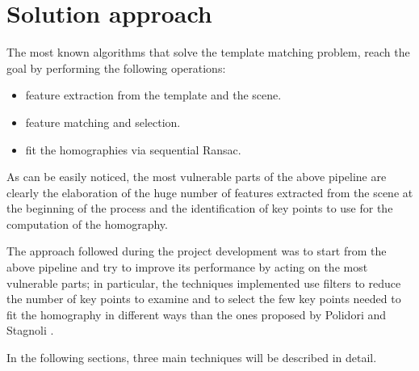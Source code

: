 \documentclass{article}
\begin{document}
\section{Solution approach} %
The most known algorithms that solve the template matching problem, reach the goal by performing the following operations:
\begin{itemize}
    \item feature extraction from the template and the scene.
    \item feature matching and selection.
    \item fit the homographies via sequential Ransac.
\end{itemize}
As can be easily noticed, the most vulnerable parts of the above pipeline are clearly the elaboration of the huge number of features extracted from the scene at the beginning of the process and the identification of key points to use for the computation of the homography.

The approach followed during the project development \cite{corti_chiari_shalby_2022} was to start from the above pipeline and try to improve its performance by acting on the most vulnerable parts; in particular, the techniques implemented use filters to reduce the number of key points to examine and to select the few key points needed to fit the homography in different ways than the ones proposed by Polidori and Stagnoli \cite{polidori_stagnoli_2022}.

In the following sections, three main techniques will be described in detail.


\end{document}

